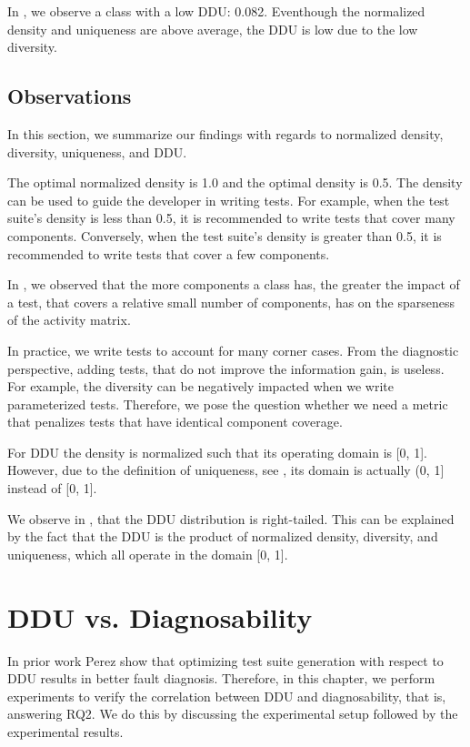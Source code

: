 \documentclass[twoside,a4paper,11pt]{memoir}
\begin{document}
In , we observe a class with a low DDU: 0.082.
Eventhough the normalized density and uniqueness are above average, the DDU is low due to the low diversity.

\section{Observations}
In this section, we summarize our findings with regards to normalized density, diversity, uniqueness, and DDU.

The optimal normalized density is 1.0 and the optimal density is 0.5.
The density can be used to guide the developer in writing tests.
For example, when the test suite's density is less than 0.5, it is recommended to write tests that cover many components.
Conversely, when the test suite's density is greater than 0.5, it is recommended to write tests that cover a few components.

In , we observed that the more components a class has, the greater the impact of a test, that covers a relative small number of components, has on the sparseness of the activity matrix.

In practice, we write tests to account for many corner cases.
From the diagnostic perspective, adding tests, that do not improve the information gain, is useless.
For example, the diversity can be negatively impacted when we write parameterized tests.
Therefore, we pose the question whether we need a metric that penalizes tests that have identical component coverage.

For DDU the density is normalized such that its operating domain is [0, 1].
However, due to the definition of uniqueness, see , its domain is actually (0, 1] instead of [0, 1].

We observe in , that the DDU distribution is right-tailed.
This can be explained by the fact that the DDU is the product of normalized density, diversity, and uniqueness, which all operate in the domain [0, 1].

%



\chapter{DDU vs. Diagnosability}
\label{ch:rq2}
In prior work Perez \etal \cite{DBLP:conf/icse/PerezAD17} show that optimizing test suite generation with respect to DDU results in better fault diagnosis.
Therefore, in this chapter, we perform experiments to verify the correlation between DDU and diagnosability, that is, answering RQ2.
We do this by discussing the experimental setup followed by the experimental results.
\end{document}
